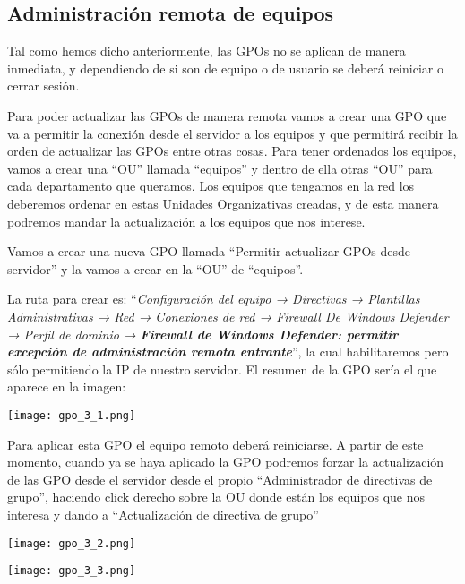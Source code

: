 \subsection{Administración remota de equipos}
Tal como hemos dicho anteriormente, las GPOs no se aplican de manera inmediata, y dependiendo de si son de equipo o de usuario se deberá reiniciar o cerrar sesión.

Para poder actualizar las GPOs de manera remota  vamos a crear una GPO que va a permitir la conexión desde el servidor a los equipos y que permitirá recibir la orden de actualizar las GPOs entre otras cosas. Para tener ordenados los equipos, vamos a crear una “OU” llamada “equipos” y dentro de ella otras “OU” para cada departamento que queramos. Los equipos que tengamos en la red los deberemos ordenar en estas Unidades Organizativas creadas, y de esta manera podremos mandar la actualización a los equipos que nos interese.

Vamos a crear una nueva GPO llamada “Permitir actualizar GPOs desde servidor” y la vamos a crear en la “OU” de “equipos”.

La ruta para crear es: “\textit{Configuración del equipo → Directivas → Plantillas Administrativas → Red → Conexiones de red → Firewall De Windows Defender → Perfil de dominio → \textbf{Firewall de Windows Defender: permitir excepción de administración remota entrante}}”, la cual habilitaremos pero sólo permitiendo la IP de nuestro servidor. El resumen de la GPO sería el que aparece en la imagen:

\begin{center}
    \texttt{[image: gpo\_3\_1.png]}
\end{center}

Para aplicar esta GPO el equipo remoto deberá reiniciarse. A partir de este momento, cuando ya se haya aplicado la GPO podremos forzar la actualización de las GPO desde el servidor desde el propio “Administrador de directivas de grupo”, haciendo click derecho sobre la OU donde están los equipos que nos interesa y dando a “Actualización de directiva de grupo”

{
    \begin{minipage}{0.48\linewidth}
        \texttt{[image: gpo\_3\_2.png]}
    \end{minipage}
    \hfill
    \begin{minipage}{0.48\linewidth}
        \texttt{[image: gpo\_3\_3.png]}
    \end{minipage}
}


